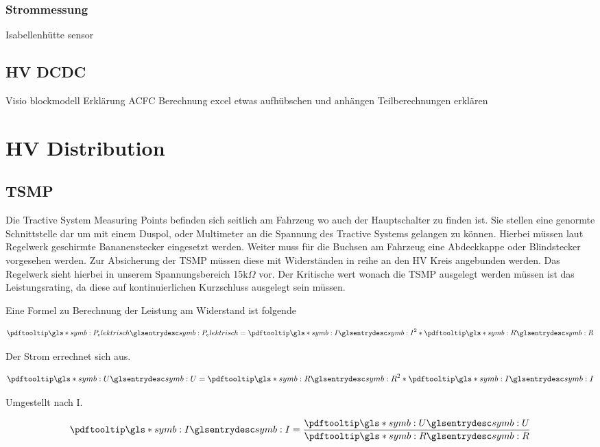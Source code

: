 \subsubsection{Strommessung}
Isabellenhütte sensor

\subsection{HV DCDC}
Visio blockmodell
Erklärung ACFC
Berechnung excel etwas aufhübschen und anhängen
Teilberechnungen erklären

\section{HV Distribution}

\subsection{TSMP}
Die Tractive System Measuring Points befinden sich seitlich am Fahrzeug wo auch der Hauptschalter zu finden ist. Sie stellen eine genormte Schnittstelle dar um mit einem Duspol, oder Multimeter an die Spannung des Tractive Systems gelangen zu können. Hierbei müssen laut Regelwerk geschirmte Bananenstecker eingesetzt werden. Weiter muss für die Buchsen am Fahrzeug eine Abdeckkappe oder Blindstecker vorgesehen werden. Zur Absicherung der TSMP müssen diese mit Widerständen in reihe an den HV Kreis angebunden werden. Das Regelwerk sieht hierbei in unserem Spannungsbereich 15k$\Omega$ vor. Der Kritische wert wonach die TSMP ausgelegt werden müssen ist das Leistungsrating, da diese auf kontinuierlichen Kurzschluss ausgelegt sein müssen.

Eine Formel zu Berechnung der Leistung am Widerstand ist folgende

\begin{equation}
	\label{eqn:Leistung am Wiederstand}
	\glsc{symb:P_elektrisch} = \glsc{symb:I}^{2} * \glsc{symb:R}
\end{equation}

Der Strom errechnet sich aus.

\begin{equation}
	\label{eqn:URI}
	\glsc{symb:U} = \glsc{symb:R}^{2} * \glsc{symb:I}
\end{equation}

Umgestellt nach I.

\begin{equation}
	\label{eqn:IUR}
	\glsc{symb:I} = \dfrac{\glsc{symb:U}} {\glsc{symb:R}}
\end{equation}

